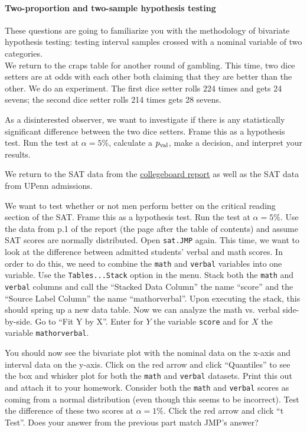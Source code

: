 \documentclass[12pt]{article}
\begin{document}
\paragraph{Two-proportion and two-sample hypothesis testing} These questions are going to familiarize you with the methodology of bivariate hypothesis testing: testing interval samples crossed with a nominal variable of two categories. \\

\problem We return to the craps table for another round of gambling. This time, two dice setters are at odds with each other both claiming that they are better than the other. We do an experiment. The first dice setter rolls 224 times and gets 24 sevens; the second dice setter rolls 214 times gets 28 sevens.

\benum
\easysubproblem As a disinterested observer, we want to investigate if there is any statistically significant difference between the two dice setters. Frame this as a hypothesis test.
\intermediatesubproblem Run the test at $\alpha=5\%$, calculate a $p_{\text{val}}$, make a decision, and interpret your results.
\eenum

\problem We return to the SAT data from the \href{http://professionals.collegeboard.com/profdownload/2010-total-group-profile-report-cbs.pdf}{collegeboard report} as well as the SAT data from UPenn admissions.

\benum
\easysubproblem We want to test whether or not men perform better on the critical reading section of the SAT. Frame this as a hypothesis test. 
\intermediatesubproblem Run the test at $\alpha=5\%$. Use the data from p.1 of the report (\ie the page after the table of contents) and assume SAT scores are normally distributed.
\intermediatesubproblem Open \texttt{sat.JMP} again. This time, we want to look at the difference between admitted students' verbal and math scores. In order to do this, we need to combine the \texttt{math} and \texttt{verbal} variables into one variable. Use the \texttt{Tables...Stack} option in the menu. Stack both the \texttt{math} and \texttt{verbal} columns and call the ``Stacked Data Column'' the name ``score'' and the ``Source Label Column'' the name ``mathorverbal''. Upon executing the stack, this should spring up a new data table. Now we can analyze the math vs. verbal side-by-side. Go to ``Fit Y by X''. Enter for $Y$ the variable \texttt{score} and for $X$ the variable  \texttt{mathorverbal}. 

You should now see the bivariate plot with the nominal data on the x-axis and interval data on the y-axis. Click on the red arrow and click ``Quantiles'' to see the box and whisker plot for both the \texttt{math} and \texttt{verbal} datasets. Print this out and attach it to your homework.
\intermediatesubproblem Consider both the \texttt{math} and \texttt{verbal} scores as coming from a normal distribution (even though this seems to be incorrect). Test the difference of these two scores at $\alpha=1\%$.
\easysubproblem Click the red arrow and click ``t Test''. Does your answer from the previous part match JMP's answer?
\eenum 
\end{document}
